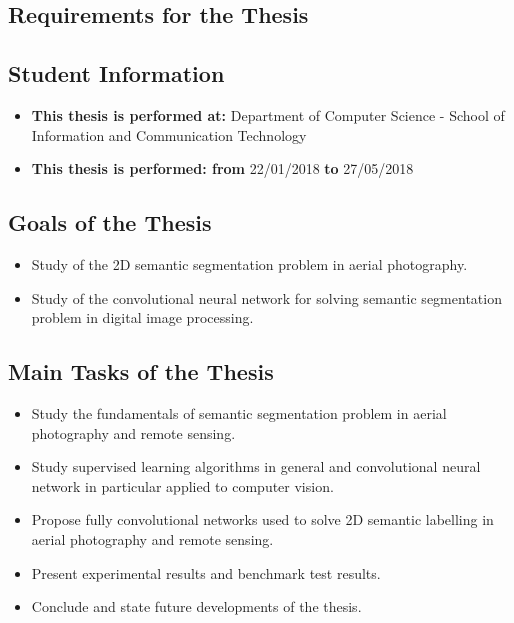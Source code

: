 \begin{spacing}{1.0}
  \chapter*{Requirements for the Thesis}
  \section*{Student Information}
  \begin{itemize}
    \item \textbf{This thesis is performed at:} Department of Computer Science
    - School of Information and
    Communication Technology
    \item \textbf{This thesis is performed: from} 22/01/2018 \textbf{to}
    27/05/2018
  \end{itemize}
  \section*{Goals of the Thesis}
    \begin{itemize}
      \item Study of the 2D semantic segmentation problem in aerial
      photography.
      \item Study of the convolutional neural network for solving semantic
      segmentation problem in digital image processing.
    \end{itemize}
    \section*{Main Tasks of the Thesis}
    \begin{itemize}
      \item Study the fundamentals of semantic segmentation problem in aerial
      photography and remote sensing.
      \item Study supervised learning algorithms in general and convolutional
      neural network in particular applied to computer vision.
      \item Propose fully convolutional networks used to solve 2D semantic
      labelling in aerial photography and remote sensing.
      \item Present experimental results and benchmark test results.
      \item Conclude and state future developments of the thesis.
    \end{itemize}

\end{spacing}

